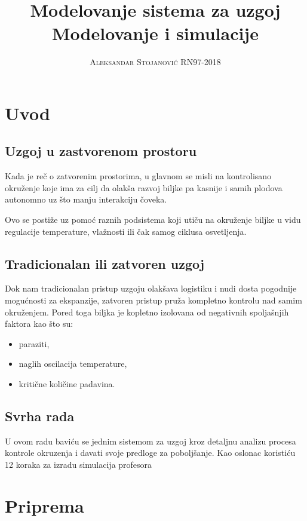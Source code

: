 \documentclass[a4paper,11pt]{book}
\title{\Huge \textbf{Modelovanje sistema za uzgoj} \\ \huge Modelovanje i simulacije}
\author{\textsc{Aleksandar Stojanović RN97-2018}}
\begin{document}
\maketitle
\tableofcontents

\chapter*{Uvod}

\section*{Uzgoj u zastvorenom prostoru}
Kada je reč o zatvorenim prostorima, u glavnom se misli na kontrolisano okruženje koje ima za cilj da olakša razvoj biljke pa kasnije i samih plodova autonomno uz što manju interakciju čoveka.

Ovo se postiže uz pomoć raznih podsistema koji utiču na okruženje biljke u vidu regulacije temperature, vlažnosti ili čak samog ciklusa osvetljenja.
\section*{Tradicionalan ili zatvoren uzgoj}
Dok nam tradicionalan pristup uzgoju olakšava logistiku i nudi dosta pogodnije mogućnosti za ekspanzije, zatvoren pristup pruža kompletno kontrolu nad samim okruženjem. Pored toga biljka je kopletno izolovana od negativnih spoljašnjih faktora kao što su:

\begin{itemize}
  \item paraziti,
  \item naglih oscilacija temperature,
  \item kritične količine padavina.
\end{itemize}


\section*{Svrha rada}
U ovom radu baviću se jednim sistemom za uzgoj kroz detaljnu analizu procesa kontrole okruzenja i davati svoje predloge za poboljšanje. Kao oslonac koristiću 12 koraka za izradu simulacija profesora 


\chapter{Priprema}
\end{document}
